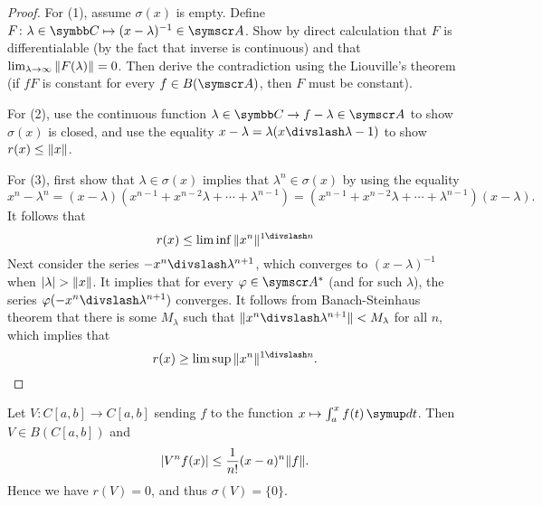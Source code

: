 \begin{proof}
  For (1), assume $\sigma(x)$ is empty. Define $F\colon \lambda\in\CC\mapsto (x-\lambda)^{-1}\in \BA A$. Show by direct calculation that $F$ is differentialable (by the fact that inverse is continuous) and that $\lim_{\lambda\to\infty} \Vert F(\lambda)\Vert=0$. Then derive the contradiction using the Liouville's theorem (if $fF$ is constant for every $f\in B(\BA A)$, then $F$ must be constant).

  For (2), use the continuous function $\lambda\in\CC\to f-\lambda\in\BA A$ to show $\sigma(x)$ is closed, and use the equality $x-\lambda=\lambda(x\DIV\lambda-1)$ to show $r(x)\leq \Vert x\Vert$.

  For (3), first show that $\lambda\in\sigma(x)$ implies that $\lambda^n\in\sigma(x)$ by using the equality
  \begin{equation*}
    x^n-\lambda^n = (x-\lambda)(x^{n-1}+x^{n-2}\lambda+\dotsb+\lambda^{n-1}) = (x^{n-1}+x^{n-2}\lambda+\dotsb+\lambda^{n-1})(x-\lambda).
  \end{equation*}
  It follows that
  \begin{equation*}
    r(x)\leq \liminf \NORM{x^n}^{1\DIV n}
  \end{equation*}
  Next consider the series $-x^n\DIV \lambda^{n+1}$, which converges to $(x-\lambda)^{-1}$ when $\vert\lambda\vert>\Vert x\Vert$. It implies that for every $\varphi\in\BA A^*$ (and for such $\lambda$), the series $\varphi(-x^n\DIV \lambda^{n+1})$ converges. It follows from Banach-Steinhaus theorem that there is some $M_\lambda$ such that $\NORM{x^n\DIV \lambda^{n+1}}<M_\lambda$ for all $n$, which implies that
  \begin{equation*}
    r(x)\geq \limsup\NORM{x^n}^{1\DIV n}.
  \end{equation*}
\end{proof}

\begin{example}
  Let $V\colon C[a, b]\to C[a, b]$ sending $f$ to the function $x\mapsto \int_a^x f(t)\DIFF t$. Then $V\in B(C[a, b])$ and
  \begin{equation*}
    \vert V^nf(x)\vert\leq\frac1{n!}(x-a)^n\Vert f\Vert.
  \end{equation*}
  Hence we have $r(V)=0$, and thus $\sigma(V)=\{0\}$.
\end{example}

